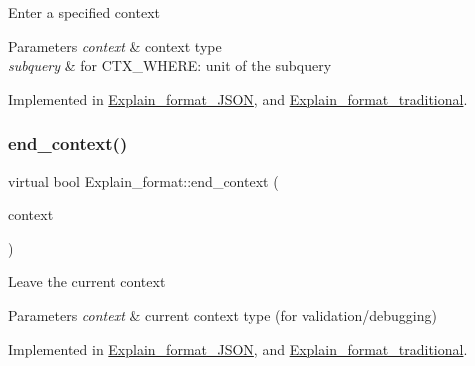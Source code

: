 Enter a specified context


\begin{DoxyParams}{Parameters}
{\em context} & context type \\
\hline
{\em subquery} & for C\+T\+X\+\_\+\+W\+H\+E\+RE\+: unit of the subquery \\
\hline
\end{DoxyParams}


Implemented in \mbox{\hyperlink{classExplain__format__JSON_a3de95e88857de347b30c13ca519c757f}{Explain\+\_\+format\+\_\+\+J\+S\+ON}}, and \mbox{\hyperlink{classExplain__format__traditional_a6919bd25e9feb9954a2fa4f06c8a4f5c}{Explain\+\_\+format\+\_\+traditional}}.

\mbox{\label{classExplain__format_a3d668c297dd5fb8ae34b11fe89dfc02b}} 
\subsubsection{\texorpdfstring{end\+\_\+context()}{end\_context()}}
{\footnotesize\ttfamily virtual bool Explain\+\_\+format\+::end\+\_\+context (\begin{DoxyParamCaption}\item[{enum\+\_\+parsing\+\_\+context}]{context }\end{DoxyParamCaption})\hspace{0.3cm}{\ttfamily [pure virtual]}}

Leave the current context


\begin{DoxyParams}{Parameters}
{\em context} & current context type (for validation/debugging) \\
\hline
\end{DoxyParams}


Implemented in \mbox{\hyperlink{classExplain__format__JSON_a6b44f355df4e59b3d33b6c334d8fda59}{Explain\+\_\+format\+\_\+\+J\+S\+ON}}, and \mbox{\hyperlink{classExplain__format__traditional_ae8a5ab39ea6b91a4100b2d60a32f4043}{Explain\+\_\+format\+\_\+traditional}}.

\mbox{\label{classExplain__format_aa822adf89028df0cdb74d39065ee9e5a}} 
